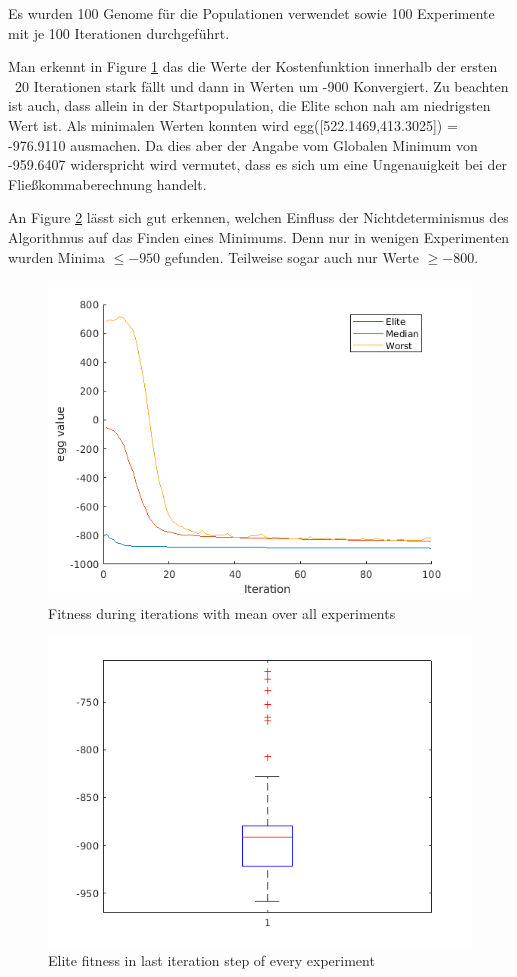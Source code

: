 \documentclass{hbrs-ecta-report}
\begin{document}
Es wurden 100 Genome für die Populationen verwendet sowie 100 Experimente mit je 100 Iterationen durchgeführt.

Man erkennt in Figure \ref{fig:fitness} das die Werte der Kostenfunktion innerhalb der ersten ~20 Iterationen stark fällt und dann in Werten um -900 Konvergiert. Zu beachten ist auch, dass allein in der Startpopulation, die Elite schon nah am niedrigsten Wert ist. \newline
Als minimalen Werten konnten wird egg([522.1469,413.3025]) = -976.9110 ausmachen. Da dies aber der Angabe vom Globalen Minimum von -959.6407 widerspricht wird vermutet, dass es sich um eine Ungenauigkeit bei der Fließkommaberechnung handelt.

An Figure \ref{fig:elite} lässt sich gut erkennen, welchen Einfluss der Nichtdeterminismus des Algorithmus auf das Finden eines Minimums. Denn nur in wenigen Experimenten wurden Minima $\leq -950$ gefunden. Teilweise sogar auch nur Werte $\ge -800$.
\begin{figure}[h]
	\includegraphics[width=\linewidth]{img/fitness-history}
	\caption{Fitness during iterations with mean over all experiments}
	\label{fig:fitness}
\end{figure}
\begin{figure}[h]
	\includegraphics[width=\linewidth]{img/elite-range-boxplot}
	\caption{Elite fitness in last iteration step of every experiment}
	\label{fig:elite}
\end{figure}
\end{document}
